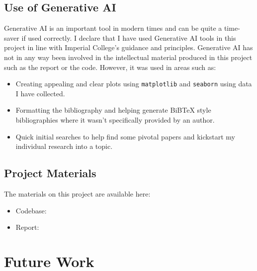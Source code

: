   \subsection{Use of Generative AI}
  Generative AI is an important tool in modern times and can be quite a time-saver if used correctly. 
  I declare that I have used Generative AI tools in this project in line with Imperial College's guidance and principles. Generative AI has not in any way been involved in the intellectual material produced in this project such as the report or the code. However, it was used in areas such as:
  \begin{itemize}
    \item Creating appealing and clear plots using \verb|matplotlib| and \verb|seaborn|  using data I have collected.
    \item Formatting the bibliography and helping generate BiBTeX style bibliographies where it wasn't specifically provided by an author.
    \item Quick initial searches to help find some pivotal papers and kickstart my individual research into a topic.
  \end{itemize}

  \subsection{Project Materials}
  The materials on this project are available here:
  \begin{itemize}
    \item Codebase: 
    \item Report: 
  \end{itemize}

\section{Future Work}
